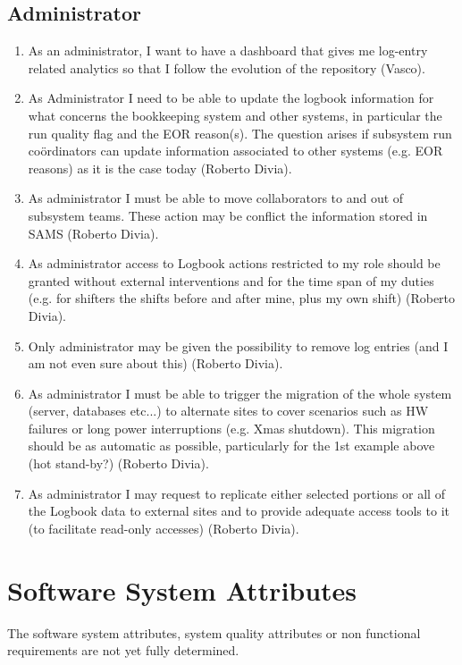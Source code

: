 \subsection{Administrator}
\begin{enumerate}
  \item As an administrator, I want to have a dashboard that gives me log-entry related analytics so that I follow the evolution of the repository (Vasco). 
  \item As Administrator I need to be able to update the logbook information for what concerns the bookkeeping system and other systems, in particular the run quality flag and the EOR reason(s). The question arises if subsystem run co\"ordinators can update information associated to other systems (e.g. EOR reasons) as it is the case today (Roberto Divia).
  \item As administrator I must be able to move collaborators to and out of subsystem teams. These action may be conflict the information stored in SAMS (Roberto Divia).
    \item As administrator access to Logbook actions restricted to my role should be granted without external interventions and for the time span of my duties (e.g. for shifters the shifts before and after mine, plus my own shift) (Roberto Divia).
  \item Only administrator may be given the possibility to remove log entries (and I am not even sure about this) (Roberto Divia).
\item As administrator I must be able to trigger the migration of the whole system (server, databases etc...) to alternate sites to cover scenarios such as HW failures or long power interruptions (e.g. Xmas shutdown). This migration should be as automatic as possible, particularly for the 1st example above (hot stand-by?) (Roberto Divia).
  \item As administrator I may request to replicate either selected portions or all of the Logbook data to external sites and to provide adequate access tools to it (to facilitate read-only accesses) (Roberto Divia).

\end{enumerate}






\section{Software System Attributes}
The software system attributes, system quality attributes or non functional requirements are not yet fully determined. 




